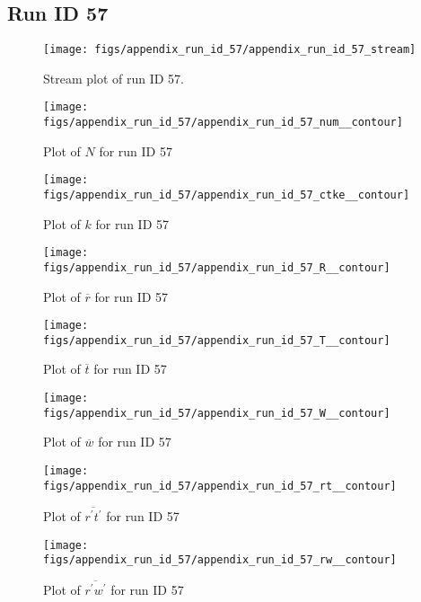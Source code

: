 \subsection{Run ID 57}
\begin{figure}[H]
\centering
\texttt{[image: figs/appendix\_run\_id\_57/appendix\_run\_id\_57\_stream]}
\caption{Stream plot of run ID 57.}
\label{fig:appendix_run_id_57_stream}
\end{figure}


\begin{figure}[H]
\centering
\texttt{[image: figs/appendix\_run\_id\_57/appendix\_run\_id\_57\_num\_\_contour]}
\caption{Plot of $N$ for run ID 57}
\label{fig:appendix_run_id_57_num__contour}
\end{figure}


\begin{figure}[H]
\centering
\texttt{[image: figs/appendix\_run\_id\_57/appendix\_run\_id\_57\_ctke\_\_contour]}
\caption{Plot of $k$ for run ID 57}
\label{fig:appendix_run_id_57_ctke__contour}
\end{figure}


\begin{figure}[H]
\centering
\texttt{[image: figs/appendix\_run\_id\_57/appendix\_run\_id\_57\_R\_\_contour]}
\caption{Plot of $\overline{r}$ for run ID 57}
\label{fig:appendix_run_id_57_R__contour}
\end{figure}


\begin{figure}[H]
\centering
\texttt{[image: figs/appendix\_run\_id\_57/appendix\_run\_id\_57\_T\_\_contour]}
\caption{Plot of $\overline{t}$ for run ID 57}
\label{fig:appendix_run_id_57_T__contour}
\end{figure}


\begin{figure}[H]
\centering
\texttt{[image: figs/appendix\_run\_id\_57/appendix\_run\_id\_57\_W\_\_contour]}
\caption{Plot of $\overline{w}$ for run ID 57}
\label{fig:appendix_run_id_57_W__contour}
\end{figure}


\begin{figure}[H]
\centering
\texttt{[image: figs/appendix\_run\_id\_57/appendix\_run\_id\_57\_rt\_\_contour]}
\caption{Plot of $\overline{r^\prime t^\prime}$ for run ID 57}
\label{fig:appendix_run_id_57_rt__contour}
\end{figure}


\begin{figure}[H]
\centering
\texttt{[image: figs/appendix\_run\_id\_57/appendix\_run\_id\_57\_rw\_\_contour]}
\caption{Plot of $\overline{r^\prime w^\prime}$ for run ID 57}
\label{fig:appendix_run_id_57_rw__contour}
\end{figure}


